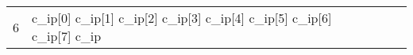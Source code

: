 \begin{longtable}{| p{0.5cm} | p{3cm} | p{8.5cm} | p{4cm} |}
6 &  c\_ip[0] \newline  c\_ip[1] \newline c\_ip[2] \newline c\_ip[3] \newline c\_ip[4] \newline c\_ip[5] \newline c\_ip[6] \newline c\_ip[7] \newline c\_ip
\end{longtable}

